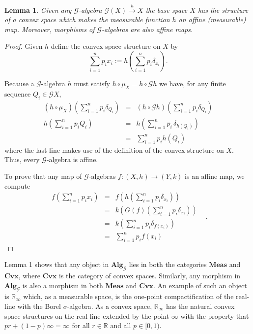 \documentclass[11pt]{amsart}    %
\newtheorem{lemma}{Lemma}
\newcommand{\G}{\mathcal{G}}
\begin{document}
\begin{lemma} \label{FunThm} Given any $\G$-algebra $\G(X) \xrightarrow{h} X$ the base space $X$ has the structure of a convex space which makes the measurable function $h$ an affine (measurable) map. Moreover, morphisms of $\G$-algebras are also affine maps.
\end{lemma}
\begin{proof} Given $h$ define the convex space structure on $X$ by
\begin{equation}
 \sum_{i=1}^{n} p_i x_i := h(\sum_{i=1}^{n} p_i \delta_{x_i}).
\end{equation}

Because a $\G$-algebra $h$ must satisfy $h \circ \mu_X = h \circ \G{h}$ we have, for any finite sequence $Q_i \in \G{X}$, 
\begin{equation}
\begin{array}{lcl}
(h \circ \mu_X)( \sum_{i=1}^{n} p_i \delta_{Q_i}) &=& (h \circ \G{h})( \sum_{i=1}^{n} p_i \delta_{Q_i}) \\
h( \sum_{i=1}^{n} p_i Q_i) &=& h(\sum_{i=1}^{n} p_i \, \delta_{h(Q_i)}) \\
 &=& \sum_{i=1}^{n} p_i h(Q_i)
\end{array}
\end{equation}
where the last line makes use of the definition of the convex structure on $X$. Thus, every $\G$-algebra is affine.

To prove that any map of $\G$-algebras $f: (X, h) \to (Y, k)$ is an affine map, we compute
\begin{equation}
\begin{array}{lcll}
f(\sum_{i=1}^{n} p_i x_i) &=& f(h(\sum_{i=1}^{n} p_i \delta_{x_i})) &  \\
&=& k(G(f)(\sum_{i=1}^{n} p_i \delta_{x_i})) &  \\
&=& k(\sum_{i=1}^{n} p_i \delta_{f(x_i)}) &  \\
&=& \sum_{i=1}^{n} p_i f(x_i) & 
\end{array}.
\end{equation}

\end{proof}

Lemma 1 shows that any object in $\mathbf{Alg}_{\G}$ lies in both the categories $\mathbf{Meas}$ and $\mathbf{Cvx}$, where $\mathbf{Cvx}$ is the category of convex spaces.  Similarly, any morphism in $\mathbf{Alg}_{\G}$ is also a morphism in both  $\mathbf{Meas}$ and $\mathbf{Cvx}$.  An example of such an object is $\mathbb{R}_{\infty}$ which, as a measurable space, is  the one-point compactification of the real-line with the Borel $\sigma$-algebra. As a convex space, $\mathbb{R}_{\infty}$ has the natural convex space structures on the real-line extended by the point $\infty$ with the property that $p r + (1-p) \infty = \infty$ for all $r \in \mathbb{R}$ and all $p \in [0,1)$.
\end{document}
